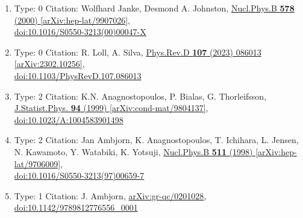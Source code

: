 \documentclass[a4paper,10pt]{article}
\begin{document}
\begin{enumerate}
\begin{enumerate}
  \item Type: 0 Citation: Wolfhard Janke, Desmond A. Johnston, \href{https://www.doi.org/10.1016/S0550-3213(00)00047-X}{Nucl.Phys.B {\bf 578} (2000) }  \href{https://arxiv.org/abs/hep-lat/9907026}{[arXiv:hep-lat/9907026]},\\\href{https://www.doi.org/10.1016/S0550-3213(00)00047-X}{doi:10.1016/S0550-3213(00)00047-X}
  \item Type: 0 Citation: R. Loll, A. Silva, \href{https://www.doi.org/10.1103/PhysRevD.107.086013}{Phys.Rev.D {\bf 107} (2023) 086013}  \href{https://arxiv.org/abs/2302.10256}{[arXiv:2302.10256]},\\\href{https://www.doi.org/10.1103/PhysRevD.107.086013}{doi:10.1103/PhysRevD.107.086013}
  \item Type: 2 Citation: K.N. Anagnostopoulos, P. Bialas, G. Thorleifsson, \href{https://www.doi.org/10.1023/A:1004583901498}{J.Statist.Phys. {\bf 94} (1999) }  \href{https://arxiv.org/abs/cond-mat/9804137}{[arXiv:cond-mat/9804137]},\\\href{https://www.doi.org/10.1023/A:1004583901498}{doi:10.1023/A:1004583901498}
  \item Type: 2 Citation: Jan Ambjorn, K. Anagnostopoulos, T. Ichihara, L. Jensen, N. Kawamoto, Y. Watabiki, K. Yotsuji, \href{https://www.doi.org/10.1016/S0550-3213(97)00659-7}{Nucl.Phys.B {\bf 511} (1998) }  \href{https://arxiv.org/abs/hep-lat/9706009}{[arXiv:hep-lat/9706009]},\\\href{https://www.doi.org/10.1016/S0550-3213(97)00659-7}{doi:10.1016/S0550-3213(97)00659-7}
  \item Type: 1 Citation: J. Ambjorn, \href{https://arxiv.org/abs/gr-qc/0201028}{arXiv:gr-qc/0201028},\\\href{https://www.doi.org/10.1142/9789812776556_0001}{doi:10.1142/9789812776556\_0001}

\end{enumerate}
\end{enumerate}
\end{document}
